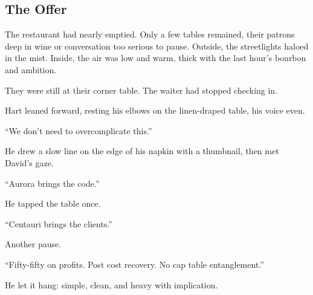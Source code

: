 \medskip

\subsection{The Offer}

The restaurant had nearly emptied. Only a few tables remained, their patrons deep in wine or conversation too serious to pause. 
Outside, the streetlights haloed in the mist. Inside, the air was low and warm, thick with the last hour’s bourbon and ambition.

They were still at their corner table. The waiter had stopped checking in.

Hart leaned forward, resting his elbows on the linen-draped table, his voice even.

``We don’t need to overcomplicate this.''

He drew a slow line on the edge of his napkin with a thumbnail, then met David’s gaze.

``Aurora brings the code.''

He tapped the table once.

``Centauri brings the clients.''

Another pause.

``Fifty-fifty on profits. Post cost recovery. No cap table entanglement.''

He let it hang: simple, clean, and heavy with implication.

\medskip

